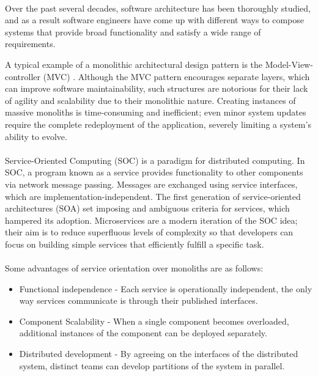 \paragraph{}

Over the past several decades, software architecture has been thoroughly studied, and as a result software engineers have come up with different ways
to compose systems that provide broad functionality and satisfy a wide range of requirements.

A typical example of a monolithic architectural design pattern is the Model-View-controller (MVC) \cite{mvc, microservices}.
Although the MVC pattern encourages separate layers, which can improve software maintainability,
such structures are notorious for their lack of agility and scalability due to their monolithic nature.
Creating instances of massive monoliths is time-consuming and inefficient;
even minor system updates require the complete redeployment of the application, severely limiting a system's ability to evolve.

\paragraph{}

Service-Oriented Computing (SOC) \cite{6} is a paradigm for distributed computing.
In SOC, a program known as a service provides functionality to other components via network message passing.
Messages are exchanged using service interfaces, which are implementation-independent.
The first generation of service-oriented architectures (SOA) \cite{7} set imposing and ambiguous criteria for services, which hampered its adoption.
Microservices \cite{microservices} are a modern iteration of the SOC idea;
their aim is to reduce superfluous levels of complexity so that developers can focus on building simple services that efficiently fulfill a specific task.

\paragraph{}

Some advantages of service orientation over monoliths are as follows:
\begin{itemize}
    \item Functional independence - Each service is operationally independent, the only way services communicate is through their published interfaces.
    \item Component Scalability - When a single component becomes overloaded, additional instances of the component can be deployed separately.
    \item Distributed development - By agreeing on the interfaces of the distributed system, distinct teams can develop partitions of the system in parallel.
\end{itemize}


